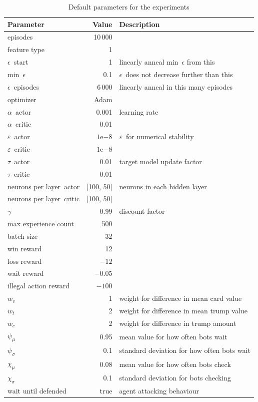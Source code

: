 \documentclass[a4paper,titlepage]{article}
\newcommand{\expn}[2]{{#1}\mathrm{e}{#2}}
\begin{document}
\begin{table}[h]
\centering
  \begin{tabular}{lrl}
    \toprule
    Parameter & Value & Description \\
    \midrule
    episodes & 10\,000 \\
    feature type & 1 \\
    $\epsilon$~start & 1 & linearly anneal min~$\epsilon$ from this\\
    min~$\epsilon$ & 0.1 & $\epsilon$~does not decrease further than this \\
    $\epsilon$~episodes & 6\,000 & linearly anneal in this many episodes \\
    optimizer & Adam \\
    $\alpha$~actor & 0.001 & learning rate \\
    $\alpha$~critic & 0.01 \\
    $\varepsilon$~actor & $\expn{1}{-8}$ & $\varepsilon$~for numerical stability \\
    $\varepsilon$~critic & $\expn{1}{-8}$ \\
    $\tau$~actor & 0.01 & target model update factor \\
    $\tau$~critic & 0.01 \\
    neurons per layer~actor & [100, 50] & neurons in each hidden layer \\
    neurons per layer~critic & [100, 50] \\
    $\gamma$ & 0.99 & discount factor \\
    max experience count & 500 \\
    batch size & 32 \\
    win reward & 12 \\
    loss reward & $-12$ \\
    wait reward & $-0.05$ \\
    illegal action reward & $-100$ \\
    $w_v$ & 1 & weight for difference in mean card value \\
    $w_t$ & 2 & weight for difference in mean trump value \\
    $w_c$ & 2 & weight for difference in trump amount \\
    $\psi_\mu$ & 0.95 & mean value for how often bots wait \\
    $\psi_\sigma$ & 0.1 & standard deviation for how often bots wait \\
    $\chi_\mu$ & 0.08 & mean value for how often bots check \\
    $\chi_\sigma$ & 0.1 & standard deviation for bots checking \\
    wait until defended & true & agent attacking behaviour \\
    \bottomrule
  \end{tabular}
  \caption{Default parameters for the experiments}
  \label{table:parameters}
\end{table}
\end{document}
